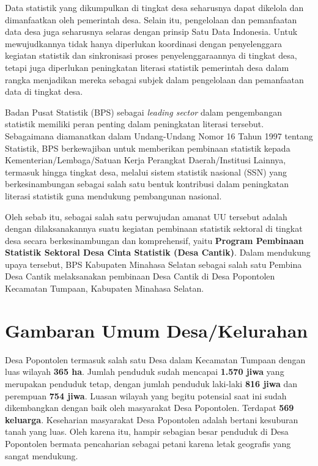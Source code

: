 Data statistik yang dikumpulkan di tingkat desa seharusnya dapat dikelola dan dimanfaatkan oleh pemerintah desa. Selain itu, pengelolaan dan pemanfaatan data desa juga seharusnya selaras dengan prinsip Satu Data Indonesia. Untuk mewujudkannya tidak hanya diperlukan koordinasi dengan penyelenggara kegiatan statistik dan sinkronisasi proses penyelenggaraannya di tingkat desa, tetapi juga diperlukan peningkatan literasi statistik pemerintah desa dalam rangka menjadikan mereka sebagai subjek dalam pengelolaan dan pemanfaatan data di tingkat desa.

Badan Pusat Statistik (BPS) sebagai \textit{leading sector} dalam pengembangan statistik memiliki peran penting dalam peningkatan literasi tersebut. Sebagaimana diamanatkan dalam Undang-Undang Nomor 16 Tahun 1997 tentang Statistik, BPS berkewajiban untuk memberikan pembinaan statistik kepada Kementerian/Lembaga/Satuan Kerja Perangkat Daerah/Institusi Lainnya, termasuk hingga tingkat desa, melalui sistem statistik nasional (SSN) yang berkesinambungan sebagai salah satu bentuk kontribusi dalam peningkatan literasi statistik guna mendukung pembangunan nasional.

Oleh sebab itu, sebagai salah satu perwujudan amanat UU tersebut adalah dengan dilaksanakannya suatu kegiatan pembinaan statistik sektoral di tingkat desa secara berkesinambungan dan komprehensif, yaitu \textbf{\textcolor{bpsnavy}{Program Pembinaan Statistik Sektoral Desa Cinta Statistik (Desa Cantik)}}. Dalam mendukung upaya tersebut, BPS Kabupaten Minahasa Selatan sebagai salah satu Pembina Desa Cantik melaksanakan pembinaan Desa Cantik di Desa Popontolen Kecamatan Tumpaan, Kabupaten Minahasa Selatan.

\section{Gambaran Umum Desa/Kelurahan}

Desa Popontolen termasuk salah satu Desa dalam Kecamatan Tumpaan dengan luas wilayah \textbf{\textcolor{bpsnavy}{365 ha}}. Jumlah penduduk sudah mencapai \textbf{\textcolor{bpsnavy}{1.570 jiwa}} yang merupakan penduduk tetap, dengan jumlah penduduk laki-laki \textbf{\textcolor{bpsnavy}{816 jiwa}} dan perempuan \textbf{\textcolor{bpsnavy}{754 jiwa}}. Luasan wilayah yang begitu potensial saat ini sudah dikembangkan dengan baik oleh masyarakat Desa Popontolen. Terdapat \textbf{\textcolor{bpsnavy}{569 keluarga}}. Keseharian masyarakat Desa Popontolen adalah bertani kesuburan tanah yang luas. Oleh karena itu, hampir sebagian besar penduduk di Desa Popontolen bermata pencaharian sebagai petani karena letak geografis yang sangat mendukung.

